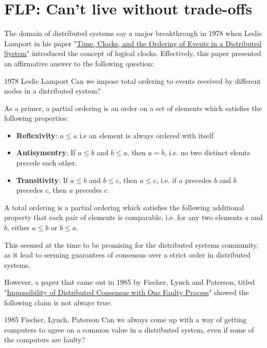 \section{FLP: Can't live without trade-offs}


The domain of distributed systems say a major breakthrough in 1978 when Leslie Lamport in his paper "\href{https://amturing.acm.org/p558-lamport.pdf}{Time, Clocks, and the Ordering of Events in a Distributed System}" introduced the concept of logical clocks. Effectively, this paper presented an affirmative answer to the following question:

\begin{quotebox}{1978 Leslie Lamport}
    Can we impose total ordering to events received by different nodes in a distributed system?
\end{quotebox}

As a primer, a partial ordering is an order on a set of elements which satisfies the following properties:
\begin{itemize}
    \item \textbf{Reflexivity}: $a \leq a$ i.e an element is always ordered with itself
    \item \textbf{Antisymentry}: If $a \leq b$ and $b \leq a$, then $a = b$, i.e. no two distinct elemts precede each other.
    \item \textbf{Transitivity}: If $a \leq b$ and $b \leq c$, then $a \leq c$, i.e. if $a$ precedes $b$ and $b$ precedes $c$, then $a$ precedes $c$.
\end{itemize}

A total ordering is a partial ordering which satisfies the following additional property that each pair of elements is comparable, i.e. for any two elements $a$ and $b$, either $a \leq b$ or $b \leq a$.

This seemed at the time to be promising for the distributed systems community, as it lead to seeming guarantees of consensus over a strict order in distributed systems. 

However, a paper that came out in 1985 by Fischer, Lynch and Paterson, titled "\href{https://groups.csail.mit.edu/tds/papers/Lynch/jacm85.pdf}{Impossibility of Distributed Consensus with One Faulty Process}" showed the following claim is not always true: 

\begin{quotebox}{1985 Fischer, Lynch, Paterson}
    Can we always come up with a way of getting computers to agree on a common value in a distributed system, even if some of the computers are faulty?
\end{quotebox}

